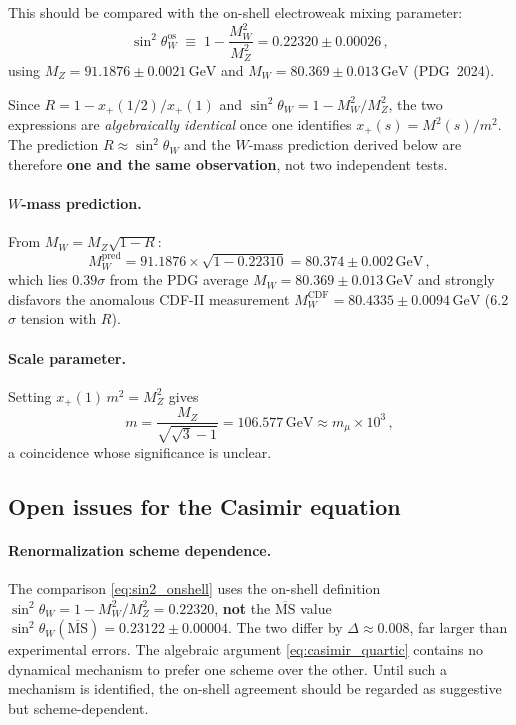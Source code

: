 \documentclass[12pt,a4paper]{article}
\newcommand{\GeV}{\,\text{GeV}}
\begin{document}
This should be compared with the on-shell electroweak mixing
parameter:
\begin{equation}
\label{eq:sin2_onshell}
\sin^2\!\theta_W^{\text{os}}
  \;\equiv\; 1 - \frac{M_W^2}{M_Z^2}
  = 0.22320 \pm 0.00026\,,
\end{equation}
using $M_Z = 91.1876 \pm 0.0021\GeV$ and
$M_W = 80.369 \pm 0.013\GeV$ (PDG~2024).

Since $R = 1 - x_+(1/2)/x_+(1)$ and
$\sin^2\!\theta_W = 1 - M_W^2/M_Z^2$, the two expressions are
\emph{algebraically identical} once one identifies
$x_+(s) = M^2(s)/m^2$.  The prediction $R \approx
\sin^2\!\theta_W$ and the $W$-mass prediction derived below are
therefore \textbf{one and the same observation}, not two
independent tests.

\paragraph{$W$-mass prediction.}
From $M_W = M_Z\sqrt{1 - R}$:
\begin{equation}
M_W^{\text{pred}}
  = 91.1876 \times \sqrt{1 - 0.22310}
  = 80.374 \pm 0.002\GeV\,,
\end{equation}
which lies $0.39\sigma$ from the PDG average
$M_W = 80.369 \pm 0.013\GeV$ and strongly disfavors the
anomalous CDF-II measurement $M_W^{\text{CDF}} = 80.4335 \pm
0.0094\GeV$ (6.2$\sigma$ tension with $R$).

\paragraph{Scale parameter.}
Setting $x_+(1)\,m^2 = M_Z^2$ gives
\begin{equation}
m = \frac{M_Z}{\sqrt{\sqrt{3} - 1}}
  = 106.577\GeV
  \approx m_\mu \times 10^3\,,
\end{equation}
a coincidence whose significance is unclear.

\subsection{Open issues for the Casimir equation}
\label{subsec:casimir_open}

\paragraph{Renormalization scheme dependence.}
The comparison \eqref{eq:sin2_onshell} uses the on-shell
definition $\sin^2\!\theta_W = 1 - M_W^2/M_Z^2 = 0.22320$,
\textbf{not} the $\overline{\text{MS}}$ value
$\sin^2\!\theta_W(\overline{\text{MS}}) = 0.23122 \pm 0.00004$.
The two differ by $\Delta \approx 0.008$, far larger than
experimental errors.  The algebraic argument
\eqref{eq:casimir_quartic} contains no dynamical mechanism to
prefer one scheme over the other.  Until such a mechanism is
identified, the on-shell agreement should be regarded as
suggestive but scheme-dependent.
\end{document}
